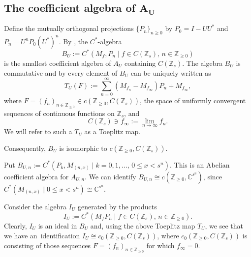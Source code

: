\documentclass[10pt,a4paper]{amsart}
\newcommand{\C}{{\mathbb C}}
\newcommand{\Z}{{\mathbb Z}}
\numberwithin{equation}{section}
\begin{document}
\subsection[The coefficient algebra of A\_U]{The coefficient algebra of $\boldsymbol{A_U}$}

Define the mutually orthogonal projections $\{P_n\}_{n\ge 0}$ by
$P_0=I-UU^*$ and $ P_n = U^nP_0(U^*)^{n}$.
By \cite[Proposition 4.2]{HKMP3}, the $C^*$-algebra
\begin{equation*}
B_U:=C^*(M_f,P_n\mid f\in C(\Z_s),\,n\in\Z_{\geq 0})
\end{equation*}
is the smallest coefficient algebra of $A_U$ containing $C(\Z_s)$. The algebra $B_U$ is commutative and by \cite[Proposition 4.3]{HKMP3} every element of $B_U$ can be uniquely written as
\begin{equation*}
T_U(F):= \sum_{n=0}^{\infty}(M_{f_n}-M_{f_\infty})P_n+M_{f_\infty},
\end{equation*}
where $F=(f_n)_{n\in \Z_{\ge0}}\in c(\Z_{\ge0}, C(\Z_s))$, the space of uniformly convergent sequences of continuous functions on $\Z_s$, and
\begin{equation}\label{finf}
C(\Z_s)\ni f_\infty:=\lim_{n\to\infty}f_n.
\end{equation}
We will refer to such a $T_U$ as a Toeplitz map.

Consequently,
$B_U$ is isomorphic to $c(\Z_{\ge0}, C(\Z_s))$.

Put $B_{U,n}:=C^*(P_k,M_{(n,x)}\mid k=0,1,\dots, \, 0\le x < s^n)$. This is an Abelian coefficient algebra for $A_{U,n}$. We can identify $B_{U,n}\cong c(\Z_{\ge 0},\C^{s^n})$, since $C^*(M_{(n,x)}\mid 0\le x < s^n)\cong \C^{s^n}$.


Consider the algebra $I_U$ generated by the products
\begin{equation*}
I_U:=C^*(M_fP_n\mid f\in C(\Z_s),\, n\in\Z_{\geq 0}).
\end{equation*}
Clearly, $I_U$ is an ideal in $B_U$ and, using the above Toeplitz map $T_U$, we see that we have an~identifi\-cation
$I_U\cong c_0(\Z_{\ge0}, C(\Z_s))$,
where $c_0(\Z_{\ge0}, C(\Z_s))$ is consisting of those sequences $F=(f_n)_{n\in \Z_{\ge0}}$ for which $f_\infty=0$.
\end{document}
